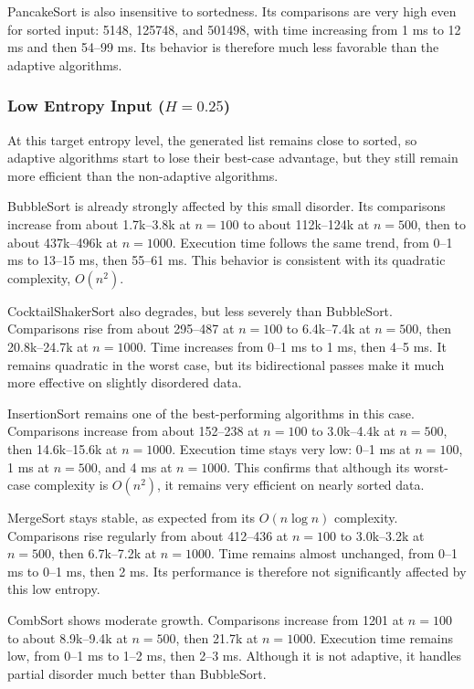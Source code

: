 \documentclass{article}
\begin{document}
PancakeSort is also insensitive to sortedness. Its comparisons are very high even for sorted input: 5148, 125748, and 501498, with time increasing from 1 ms to 12 ms and then 54--99 ms. Its behavior is therefore much less favorable than the adaptive algorithms.


\subsubsection{Low Entropy Input ($H = 0.25$)}

At this target entropy level, the generated list remains close to sorted, so adaptive algorithms start to lose their best-case advantage, but they still remain more efficient than the non-adaptive algorithms.

BubbleSort is already strongly affected by this small disorder. Its comparisons increase from about 1.7k--3.8k at $n=100$ to about 112k--124k at $n=500$, then to about 437k--496k at $n=1000$. Execution time follows the same trend, from 0--1 ms to 13--15 ms, then 55--61 ms. This behavior is consistent with its quadratic complexity, $O(n^2)$.

CocktailShakerSort also degrades, but less severely than BubbleSort. Comparisons rise from about 295--487 at $n=100$ to 6.4k--7.4k at $n=500$, then 20.8k--24.7k at $n=1000$. Time increases from 0--1 ms to 1 ms, then 4--5 ms. It remains quadratic in the worst case, but its bidirectional passes make it much more effective on slightly disordered data.

InsertionSort remains one of the best-performing algorithms in this case. Comparisons increase from about 152--238 at $n=100$ to 3.0k--4.4k at $n=500$, then 14.6k--15.6k at $n=1000$. Execution time stays very low: 0--1 ms at $n=100$, 1 ms at $n=500$, and 4 ms at $n=1000$. This confirms that although its worst-case complexity is $O(n^2)$, it remains very efficient on nearly sorted data.

MergeSort stays stable, as expected from its $O(n \log n)$ complexity. Comparisons rise regularly from about 412--436 at $n=100$ to 3.0k--3.2k at $n=500$, then 6.7k--7.2k at $n=1000$. Time remains almost unchanged, from 0--1 ms to 0--1 ms, then 2 ms. Its performance is therefore not significantly affected by this low entropy.

CombSort shows moderate growth. Comparisons increase from 1201 at $n=100$ to about 8.9k--9.4k at $n=500$, then 21.7k at $n=1000$. Execution time remains low, from 0--1 ms to 1--2 ms, then 2--3 ms. Although it is not adaptive, it handles partial disorder much better than BubbleSort.
\end{document}
